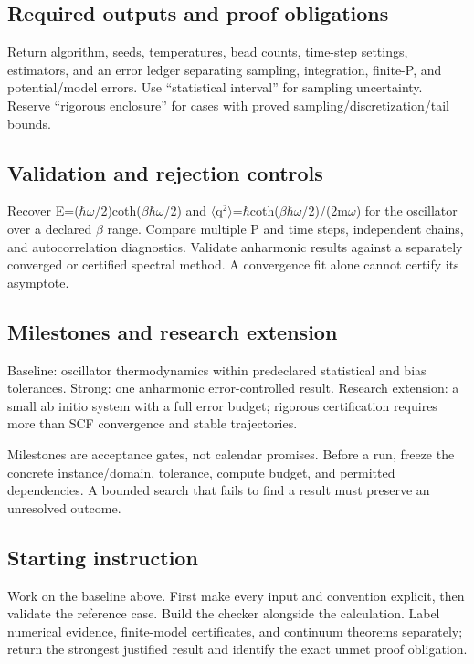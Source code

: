 \documentclass[
  11pt,
]{article}
\begin{document}
\subsection{Required outputs and proof obligations}

Return algorithm, seeds, temperatures, bead counts, time-step settings,
estimators, and an error ledger separating sampling, integration,
finite-P, and potential/model errors. Use ``statistical interval'' for
sampling uncertainty. Reserve ``rigorous enclosure'' for cases with
proved sampling/discretization/tail bounds.

\subsection{Validation and rejection controls}

Recover
E=(\ensuremath{\hbar}\ensuremath{\omega}/2)coth(\ensuremath{\beta}\ensuremath{\hbar}\ensuremath{\omega}/2)
and
\ensuremath{\langle}q\ensuremath{{}^{2}}\ensuremath{\rangle}=\ensuremath{\hbar}coth(\ensuremath{\beta}\ensuremath{\hbar}\ensuremath{\omega}/2)/(2m\ensuremath{\omega})
for the oscillator over a declared \ensuremath{\beta} range. Compare
multiple P and time steps, independent chains, and autocorrelation
diagnostics. Validate anharmonic results against a separately converged
or certified spectral method. A convergence fit alone cannot certify its
asymptote.

\subsection{Milestones and research extension}

Baseline: oscillator thermodynamics within predeclared statistical and
bias tolerances. Strong: one anharmonic error-controlled result.
Research extension: a small ab initio system with a full error budget;
rigorous certification requires more than SCF convergence and stable
trajectories.

Milestones are acceptance gates, not calendar promises. Before a run,
freeze the concrete instance/domain, tolerance, compute budget, and
permitted dependencies. A bounded search that fails to find a result
must preserve an unresolved outcome.

\subsection{Starting instruction}

Work on the baseline above. First make every input and convention
explicit, then validate the reference case. Build the checker alongside
the calculation. Label numerical evidence, finite-model certificates,
and continuum theorems separately; return the strongest justified result
and identify the exact unmet proof obligation.
\end{document}

